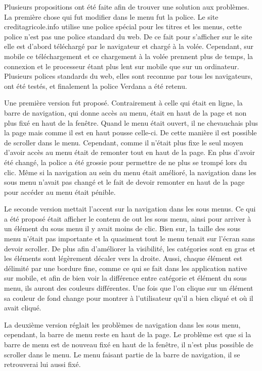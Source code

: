 \documentclass[12pt,a4paper]{article}
\begin{document}
Plusieurs propositions ont été faite afin de trouver une solution aux problèmes. La première chose qui fut modifier dans le menu fut la police. Le site creditagricole.info utilise une police spécial pour les titres et les menus, cette police n'est pas une police standard du web. De ce fait pour s'afficher sur le site elle est d'abord téléchargé par le navigateur et chargé à la volée. Cependant, sur mobile ce téléchargement et ce chargement à la volée prennent plus de temps, la connexion et le processeur étant plus lent sur mobile que sur un ordinateur. Plusieurs polices standards du web, elles sont reconnue par tous les navigateurs, ont été testés, et finalement la police Verdana a été retenu.\par
\medskip
Une première version fut proposé. Contrairement à celle qui était en ligne, la barre de navigation, qui donne accès au menu, était en haut de la page et non plus fixé en haut de la fenêtre. Quand le menu était ouvert, il ne chevauchais plus la page mais comme il est en haut pousse celle-ci. De cette manière il est possible de scroller dans le menu. Cependant, comme il n'était plus fixe le seul moyen d'avoir accès au menu était de remonter tout en haut de la page. En plus d'avoir été changé, la police a été grossie pour permettre de ne plus se trompé lors du clic. Même si la navigation au sein du menu était amélioré, la navigation dans les sous menu n'avait pas changé et le fait de devoir remonter en haut de la page pour accéder au menu était pénible.\par
\medskip
Le seconde version mettait l'accent sur la navigation dans les sous menus. Ce qui a été proposé était afficher le contenu de out les sous menu, ainsi pour arriver à un élément du sous menu il y avait moins de clic. Bien sur, la taille des sous menu n'était pas importante et la quasiment tout le menu tenait sur l'écran sans devoir scroller. De plus afin d'améliorer la visibilité, les catégories sont en gras et les éléments sont légèrement décaler vers la droite. Aussi, chaque élément est délimité par une bordure fine, comme ce qui se fait dans les application native sur mobile, et afin de bien voir la différence entre catégorie et élément du sous menu, ils auront des couleurs différentes. Une fois que l'on clique sur un élément sa couleur de fond change pour montrer à l'utilisateur qu'il a bien cliqué et où il avait cliqué.\par
La deuxième version réglait les problèmes de navigation dans les sous menu, cependant, la barre de menu reste en haut de la page. Le problème est que si la barre de menu est de nouveau fixé en haut de la fenêtre, il n'est plus possible de scroller dans le menu. Le menu faisant partie de la barre de navigation, il se retrouverai lui aussi fixé.\par
\end{document}
